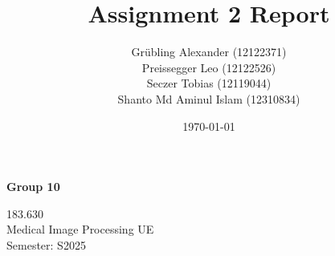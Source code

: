 \documentclass[
    a4paper,
    12pt,
    parskip=half,
]{scrarticle}
\title{Assignment 2 Report}
\author{Grübling Alexander (12122371) \\ Preissegger Leo (12122526) \\  Seczer Tobias (12119044) \\ Shanto Md Aminul Islam (12310834) }
\date{\today}
\begin{document}
\thispagestyle{empty}
\begin{titlepage}
    \makeatletter
    \centering
    {\LARGE \bfseries \sffamily \@title \par}
    \vspace{3\baselineskip}
    {\large \bfseries \sffamily Group 10 \par}
    {\large \@author \par}
    {\large \@date \par}
    \vspace{2\baselineskip}
    \vfill{}
    {\large
    183.630 \\
    Medical Image Processing UE \\
    Semester: S2025 \par}
    \makeatother
\end{titlepage}

\end{document}
